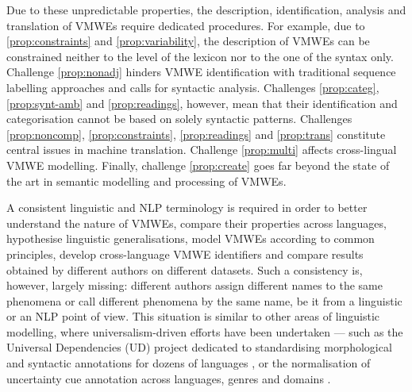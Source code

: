 \documentclass[output=paper,
modfonts,
]{langscibook}
\begin{document}
Due to these unpredictable properties, %
the description, identification, analysis and translation of VMWEs require dedicated procedures. For example, due to \ref{prop:constraints} and \ref{prop:variability}, the description of VMWEs can be constrained neither to the level of the lexicon nor to the one of the syntax only.   
Challenge \ref{prop:nonadj} hinders VMWE identification with traditional sequence labelling approaches and calls for syntactic analysis. Challenges \ref{prop:categ}, \ref{prop:synt-amb} and \ref{prop:readings},  however, mean that their identification and categorisation cannot be based on solely syntactic patterns. Challenges \ref{prop:noncomp}, \ref{prop:constraints}, \ref{prop:readings} and \ref{prop:trans} constitute central issues in machine translation. %
Challenge \ref{prop:multi} affects cross-lingual VMWE modelling. Finally, challenge \ref{prop:create} goes far beyond the state of the art in semantic modelling and processing of VMWEs.


A consistent linguistic and NLP terminology is required in order to better understand the nature of VMWEs, compare their properties across languages, hypothesise linguistic generalisations, model VMWEs according to common principles, develop cross-language VMWE identifiers and compare results obtained by different authors on different datasets. Such a consistency is, however, largely missing: different authors assign different names to the same phenomena or call different phenomena by the same name, be it from a linguistic or an NLP point of view. This situation is similar to other areas of linguistic modelling, where universalism-driven efforts have been undertaken --- such as the Universal Dependencies (UD) project dedicated to standardising morphological and syntactic annotations for dozens of languages \citep{univdep}, or the normalisation of uncertainty cue annotation across languages, genres and domains \citep{cl_uc}. 

 
\end{document}
